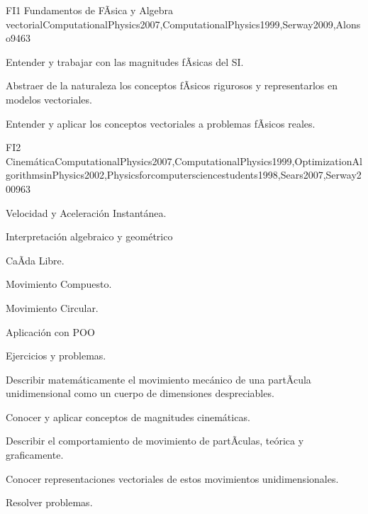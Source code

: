 \begin{syllabus}
\begin{unit}{FI1 Fundamentos de FÃ­sica y Algebra vectorial}{ComputationalPhysics2007,ComputationalPhysics1999,Serway2009,Alonso94}{6}{3}
   \begin{unitgoals}
      \item Entender y trabajar con las magnitudes fÃ­sicas del SI.
      \item Abstraer de la naturaleza los conceptos fÃ­sicos rigurosos y
      representarlos en modelos vectoriales.
      \item Entender y aplicar los conceptos vectoriales a problemas fÃ­sicos reales.
   \end{unitgoals}
\end{unit}

\begin{unit}{FI2 Cinemática}{ComputationalPhysics2007,ComputationalPhysics1999,OptimizationAlgorithmsinPhysics2002,Physicsforcomputersciencestudents1998,Sears2007,Serway2009}{6}{3}
\begin{topics}
      \item Velocidad y Aceleración Instantánea.
      \item Interpretación algebraico y geométrico
      \item CaÃ­da Libre.
      \item Movimiento Compuesto.
      \item Movimiento Circular.
      \item Aplicación con POO
      \item Ejercicios y problemas.
    \end{topics}
   \begin{unitgoals}
      \item Describir matemáticamente el movimiento mecánico de una partÃ­cula unidimensional como un cuerpo de dimensiones despreciables.
      \item Conocer y aplicar conceptos de magnitudes cinemáticas.
      \item Describir el comportamiento de movimiento de partÃ­culas, teórica y graficamente.
      \item Conocer representaciones vectoriales de estos movimientos unidimensionales.
      \item Resolver problemas.
   \end{unitgoals}
\end{unit}


\end{syllabus}
